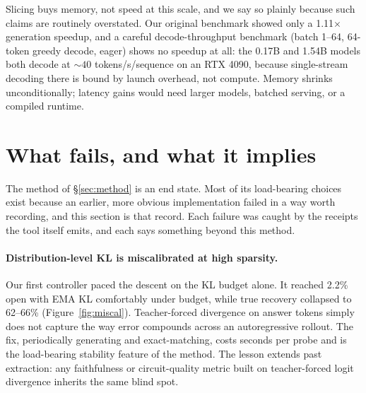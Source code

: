 \documentclass{article}
\begin{document}
Slicing buys memory, not speed at this scale, and we say so plainly because
such claims are routinely overstated. Our original benchmark showed only a
1.11$\times$ generation speedup, and a careful decode-throughput benchmark
(batch 1--64, 64-token greedy decode, eager) shows no speedup at all: the
0.17B and 1.54B models both decode at ${\sim}40$ tokens/s/sequence on an RTX
4090, because single-stream decoding there is bound by launch overhead, not
compute. Memory shrinks unconditionally; latency gains would need larger
models, batched serving, or a compiled runtime.

\section{What fails, and what it implies}\label{sec:failures}

The method of \S\ref{sec:method} is an end state. Most of its load-bearing
choices exist because an earlier, more obvious implementation failed in a way
worth recording, and this section is that record. Each failure was caught by
the receipts the tool itself emits, and each says something beyond this
method.

\paragraph{Distribution-level KL is miscalibrated at high sparsity.} Our first
controller paced the descent on the KL budget alone. It reached 2.2\% open
with EMA KL comfortably under budget, while true recovery collapsed to
62--66\% (Figure~\ref{fig:miscal}). Teacher-forced divergence on answer tokens
simply does not capture the way error compounds across an autoregressive
rollout. The fix, periodically generating and exact-matching, costs seconds
per probe and is the load-bearing stability feature of the method. The lesson
extends past extraction: any faithfulness or circuit-quality metric built on
teacher-forced logit divergence inherits the same blind spot.
\end{document}
